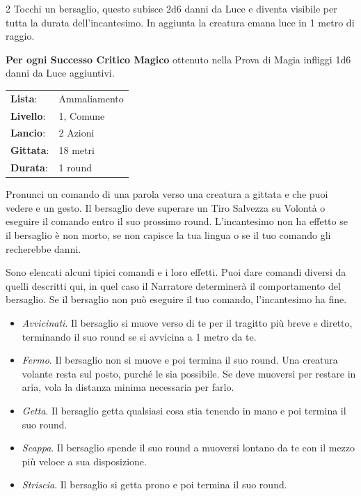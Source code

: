 \begin{multicols}{2}
Tocchi un bersaglio, questo subisce 2d6 danni da Luce e diventa visibile per tutta la durata dell'incantesimo. In aggiunta la creatura emana luce in 1 metro di raggio.

\textbf{Per ogni Successo Critico Magico} ottenuto nella Prova di Magia infliggi 1d6 danni da Luce aggiuntivi.

\noindent\begin{tabularx}{\linewidth}{p{1.9cm}X}
	\rowcolor{gray!20}\textbf{Lista}: & Ammaliamento \\
	\textbf{Livello}: & 1, Comune \\
	\rowcolor{gray!20}\textbf{Lancio}: & 2 Azioni \\
	\textbf{Gittata}: & 18 metri \\
	\rowcolor{gray!20}\textbf{Durata}: & 1 round \\
\end{tabularx}\smallskip

Pronunci un comando di una parola verso una creatura a gittata e che puoi vedere e un gesto. Il bersaglio deve superare un Tiro Salvezza su Volontà o eseguire il comando entro il suo prossimo round. L'incantesimo non ha effetto se il bersaglio è non morto, se non capisce la tua lingua o se il tuo comando gli recherebbe danni.

Sono elencati alcuni tipici comandi e i loro effetti. Puoi dare comandi diversi da quelli descritti qui, in quel caso il Narratore determinerà il comportamento del bersaglio. Se il bersaglio non può eseguire il tuo comando, l'incantesimo ha fine.

\begin{itemize}[leftmargin=*] \setlength{\itemsep}{0pt}
	\item \emph{Avvicinati}. Il bersaglio si muove verso di te per il tragitto più breve e diretto, terminando il suo round se si avvicina a 1 metro da te.
	\item \emph{Fermo}. Il bersaglio non si muove e poi termina il suo round. Una creatura volante resta sul posto, purché le sia possibile. Se deve muoversi per restare in aria, vola la distanza minima necessaria per farlo.
	\item \emph{Getta}. Il bersaglio getta qualsiasi cosa stia tenendo in mano e poi termina il suo round.
	\item \emph{Scappa}. Il bersaglio spende il suo round a muoversi lontano da te con il mezzo più veloce a sua disposizione.
	\item \emph{Striscia}. Il bersaglio si getta prono e poi termina il suo round.
\end{itemize}


\end{multicols}
